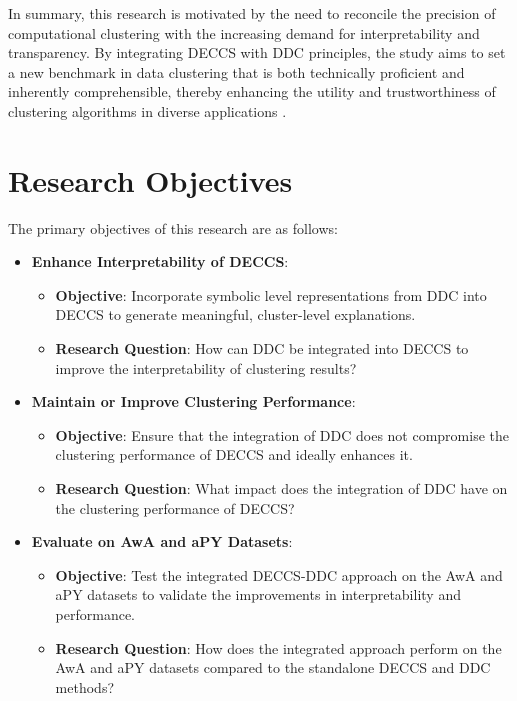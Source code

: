 In summary, this research is motivated by the need to reconcile the precision of computational clustering with the increasing demand for interpretability and transparency. By integrating DECCS with DDC principles, the study aims to set a new benchmark in data clustering that is both technically proficient and inherently comprehensible, thereby enhancing the utility and trustworthiness of clustering algorithms in diverse applications \citep{Tjoa2023}.

\section{Research Objectives}
The primary objectives of this research are as follows:
\begin{itemize}
    \item \textbf{Enhance Interpretability of DECCS}:
    \begin{itemize}
        \item \textbf{Objective}: Incorporate symbolic level representations from DDC into DECCS to generate meaningful, cluster-level explanations.
        \item \textbf{Research Question}: How can DDC be integrated into DECCS to improve the interpretability of clustering results?
    \end{itemize}
    \item \textbf{Maintain or Improve Clustering Performance}:
    \begin{itemize}
        \item \textbf{Objective}: Ensure that the integration of DDC does not compromise the clustering performance of DECCS and ideally enhances it.
        \item \textbf{Research Question}: What impact does the integration of DDC have on the clustering performance of DECCS?
    \end{itemize}
    \item \textbf{Evaluate on AwA and aPY Datasets}:
    \begin{itemize}
        \item \textbf{Objective}: Test the integrated DECCS-DDC approach on the AwA and aPY datasets to validate the improvements in interpretability and performance.
        \item \textbf{Research Question}: How does the integrated approach perform on the AwA and aPY datasets compared to the standalone DECCS and DDC methods?
    \end{itemize}
\end{itemize}